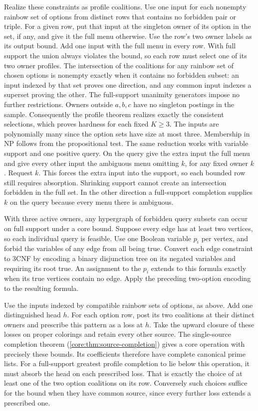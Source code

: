 Realize these constraints as profile coalitions. Use one
input for each nonempty rainbow set of options from
distinct rows that contains no forbidden pair or triple.
For a given row, put that input at the singleton owner of
its option in the set, if any, and give it the full menu
otherwise. Use the row's two owner labels as its output
bound. Add one input with the full menu in every row.
With full support the union always violates the bound, so
each row must select one of its two owner profiles.
The intersection of the coalitions for any rainbow set
of chosen options is nonempty exactly when it contains
no forbidden subset: an input indexed by that set proves
one direction, and any common input indexes a superset
proving the other. The full-support unanimity generators
impose no further restrictions. Owners outside $a,b,c$
have no singleton postings in the sample. Consequently
the profile theorem realizes exactly the consistent
selections, which proves hardness for each fixed $K\ge3$.
The inputs are polynomially many since the option sets
have size at most three. Membership in NP follows from
the propositional test.
The same reduction works with variable support and one
positive query. On the query give the extra input the
full menu and give every other input the ambiguous menu
omitting $k$, for any fixed owner $k$. Request $k$.
This forces the extra input into the support, so each
bounded row still requires absorption. Shrinking support
cannot create an intersection forbidden in the full set.
In the other direction a full-support completion supplies
$k$ on the query because every menu there is ambiguous.

With three active owners, any hypergraph of forbidden
query subsets can occur on full support under a core
bound. Suppose every edge has at least two vertices,
so each individual query is feasible. Use one Boolean
variable $p_i$ per vertex, and forbid the variables
of any edge from all being true. Convert each edge
constraint to 3CNF by encoding a binary disjunction
tree on its negated variables and requiring its root
true. An assignment to the $p_i$ extends to this
formula exactly when its true vertices contain no
edge. Apply the preceding two-option encoding to
the resulting formula.

Use the inputs indexed by compatible rainbow sets
of options, as above. Add one distinguished head $h$.
For each option row, post its two coalitions at their
distinct owners and prescribe this pattern as a loss
at $h$. Take the upward closure of these losses
on proper colorings and retain every other source.
The single-source completion theorem
(\cref{core:thm:source-completion}) gives a core
operation with precisely these bounds. Its coefficients
therefore have complete canonical prime lists.
For a full-support greatest profile completion to
lie below this operation, it must absorb the head
on each prescribed loss. That is exactly the choice
of at least one of the two option coalitions on its
row. Conversely such choices suffice for the bound
when they have common source, since every further
loss extends a prescribed one.


